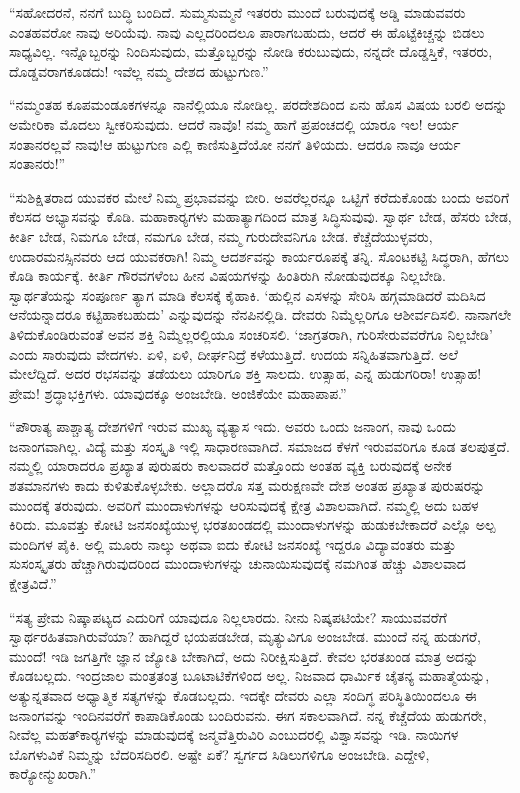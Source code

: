  “ಸಹೋದರನೆ, ನನಗೆ ಬುದ್ಧಿ ಬಂದಿದೆ. ಸುಮ್ಮಸುಮ್ಮನೆ ಇತರರು ಮುಂದೆ ಬರುವುದಕ್ಕೆ ಅಡ್ಡಿ ಮಾಡುವವರು ಎಂತಹವರೋ ನಾವು ಅರಿಯೆವು. ನಾವು ಎಲ್ಲದರಿಂದಲೂ ಪಾರಾಗಬಹುದು, ಆದರೆ ಈ ಹೊಟ್ಟೆಕಿಚ್ಚನ್ನು ಬಿಡಲು ಸಾಧ್ಯವಿಲ್ಲ. ಇನ್ನೊಬ್ಬರನ್ನು ನಿಂದಿಸುವುದು, ಮತ್ತೊಬ್ಬರನ್ನು ನೋಡಿ ಕರುಬುವುದು, ನನ್ನದೇ ದೊಡ್ಡಸ್ತಿಕೆ, ಇತರರು, ದೊಡ್ಡವರಾಗಕೂಡದು! ಇವೆಲ್ಲ ನಮ್ಮ ದೇಶದ ಹುಟ್ಟುಗುಣ.” 

 “ನಮ್ಮಂತಹ ಕೂಪಮಂಡೂಕಗಳನ್ನೂ ನಾನೆಲ್ಲಿಯೂ ನೋಡಿಲ್ಲ. ಪರದೇಶದಿಂದ ಏನು ಹೊಸ ವಿಷಯ ಬರಲಿ ಅದನ್ನು ಅಮೇರಿಕಾ ಮೊದಲು ಸ್ವೀಕರಿಸುವುದು. ಆದರೆ ನಾವೊ! ನಮ್ಮ ಹಾಗೆ ಪ್ರಪಂಚದಲ್ಲಿ ಯಾರೂ ಇಲ! ಆರ್ಯ ಸಂತಾನರಲ್ಲವೆ ನಾವು!‌ಆ ಹುಟ್ಟುಗುಣ ಎಲ್ಲಿ ಕಾಣಿಸುತ್ತಿದೆಯೋ ನನಗೆ ತಿಳಿಯದು. ಆದರೂ ನಾವೂ ಆರ್ಯ ಸಂತಾನರು!” 

 “ಸುಶಿಕ್ಷಿತರಾದ ಯುವಕರ ಮೇಲೆ ನಿಮ್ಮ ಪ್ರಭಾವವನ್ನು ಬೀರಿ. ಅವರೆಲ್ಲರನ್ನೂ ಒಟ್ಟಿಗೆ ಕರೆದುಕೊಂಡು ಬಂದು ಅವರಿಗೆ ಕೆಲಸದ ಅಭ್ಯಾಸವನ್ನು ಕೊಡಿ. ಮಹಾಕಾರ‍್ಯಗಳು ಮಹಾತ್ಯಾಗದಿಂದ ಮಾತ್ರ ಸಿದ್ಧಿಸುವುವು. ಸ್ವಾರ್ಥ ಬೇಡ, ಹೆಸರು ಬೇಡ, ಕೀರ್ತಿ ಬೇಡ, ನಿಮಗೂ ಬೇಡ, ನಮಗೂ ಬೇಡ, ನಮ್ಮ ಗುರುದೇವನಿಗೂ ಬೇಡ. ಕೆಚ್ಚೆದೆಯುಳ್ಳವರು, ಉದಾರಮನಸ್ಸಿನವರು ಆದ ಯುವಕರಾಗಿ! ನಿಮ್ಮ ಆದರ್ಶವನ್ನು ಕಾರ್ಯರೂಪಕ್ಕೆ ತನ್ನಿ. ಸೊಂಟಕಟ್ಟಿ ಸಿದ್ಧರಾಗಿ, ಹೆಗಲು ಕೊಡಿ ಕಾರ್ಯಕ್ಕೆ. ಕೀರ್ತಿ ಗೌರವಗಳೆಂಬ ಹೀನ ವಿಷಯಗಳನ್ನು ಹಿಂತಿರುಗಿ ನೋಡುವುದಕ್ಕೂ ನಿಲ್ಲಬೇಡಿ. ಸ್ವಾರ್ಥತೆಯನ್ನು ಸಂಪೂರ್ಣ ತ್ಯಾಗ ಮಾಡಿ ಕೆಲಸಕ್ಕೆ ಕೈಹಾಕಿ. ‘ಹುಲ್ಲಿನ ಎಸಳನ್ನು ಸೇರಿಸಿ ಹಗ್ಗಮಾಡಿದರೆ ಮದಿಸಿದ ಆನೆಯನ್ನಾದರೂ ಕಟ್ಟಿಹಾಕಬಹುದು’ ಎನ್ನುವುದನ್ನು ನೆನಪಿನಲ್ಲಿಡಿ. ದೇವರು ನಿಮ್ಮೆಲ್ಲರಿಗೂ ಆಶೀರ್ವದಿಸಲಿ. ನಾನಾಗಲೇ ತಿಳಿದುಕೊಂಡಿರುವಂತೆ ಅವನ ಶಕ್ತಿ ನಿಮ್ಮೆಲ್ಲರಲ್ಲಿಯೂ ಸಂಚರಿಸಲಿ. ‘ಜಾಗ್ರತರಾಗಿ, ಗುರಿಸೇರುವವರೆಗೂ ನಿಲ್ಲಬೇಡಿ’ ಎಂದು ಸಾರುವುದು ವೇದಗಳು. ಏಳಿ, ಏಳಿ, ದೀರ್ಘನಿದ್ರೆ ಕಳೆಯುತ್ತಿದೆ. ಉದಯ ಸನ್ನಿಹಿತವಾಗುತ್ತಿದೆ. ಅಲೆ ಮೇಲೆದ್ದಿದೆ. ಅದರ ರಭಸವನ್ನು ತಡೆಯಲು ಯಾರಿಗೂ ಶಕ್ತಿ ಸಾಲದು. ಉತ್ಸಾಹ, ಎನ್ನ ಹುಡುಗರಿರಾ! ಉತ್ಸಾಹ! ಪ್ರೇಮ! ಶ್ರದ್ಧಾಭಕ್ತಿಗಳು. ಯಾವುದಕ್ಕೂ ಅಂಜಬೇಡಿ. ಅಂಜಿಕೆಯೇ ಮಹಾಪಾಪ.” 

 “ಪೌರಾತ್ಯ ಪಾಶ್ಚಾತ್ಯ ದೇಶಗಳಿಗೆ ಇರುವ ಮುಖ್ಯ ವ್ಯತ್ಯಾಸ ಇದು. ಅವರು ಒಂದು ಜನಾಂಗ, ನಾವು ಒಂದು ಜನಾಂಗವಾಗಿಲ್ಲ. ವಿದ್ಯೆ ಮತ್ತು ಸಂಸ್ಕೃತಿ ಇಲ್ಲಿ ಸಾಧಾರಣವಾಗಿದೆ. ಸಮಾಜದ ಕೆಳಗೆ ಇರುವವರಿಗೂ ಕೂಡ ತಲಪುತ್ತದೆ. ನಮ್ಮಲ್ಲಿ ಯಾರಾದರೂ ಪ್ರಖ್ಯಾತ ಪುರುಷರು ಕಾಲವಾದರೆ ಮತ್ತೊಂದು ಅಂತಹ ವ್ಯಕ್ತಿ ಬರುವುದಕ್ಕೆ ಅನೇಕ ಶತಮಾನಗಳು ಕಾದು ಕುಳಿತುಕೊಳ್ಳಬೇಕು. ಅಲ್ಲಾದರೊ ಸತ್ತ ಮರುಕ್ಷಣವೇ ದೇಶ ಅಂತಹ ಪ್ರಖ್ಯಾತ ಪುರುಷರನ್ನು ಮುಂದಕ್ಕೆ ತರುವುದು. ಅವರಿಗೆ ಮುಂದಾಳುಗಳನ್ನು ಆರಿಸುವುದಕ್ಕೆ ಕ್ಷೇತ್ರ ವಿಶಾಲವಾಗಿದೆ. ನಮ್ಮಲ್ಲಿ ಅದು ಬಹಳ ಕಿರಿದು. ಮೂವತ್ತು ಕೋಟಿ ಜನಸಂಖ್ಯೆಯುಳ್ಳ ಭರತಖಂಡದಲ್ಲಿ ಮುಂದಾಳುಗಳನ್ನು ಹುಡುಕಬೇಕಾದರೆ ಎಲ್ಲೊ ಅಲ್ಪ ಮಂದಿಗಳ ಪೈಕಿ. ಅಲ್ಲಿ ಮೂರು ನಾಲ್ಕು ಅಥವಾ ಐದು ಕೋಟಿ ಜನಸಂಖ್ಯೆ ಇದ್ದರೂ ವಿದ್ಯಾವಂತರು ಮತ್ತು ಸುಸಂಸ್ಕೃತರು ಹೆಚ್ಚಾಗಿರುವುದರಿಂದ ಮುಂದಾಳುಗಳನ್ನು ಚುನಾಯಿಸುವುದಕ್ಕೆ ನಮಗಿಂತ ಹೆಚ್ಚು ವಿಶಾಲವಾದ ಕ್ಷೇತ್ರವಿದೆ.” 

 “ಸತ್ಯ ಪ್ರೇಮ ನಿಷ್ಕಾಪಟ್ಯದ ಎದುರಿಗೆ ಯಾವುದೂ ನಿಲ್ಲಲಾರದು. ನೀನು ನಿಷ್ಕಪಟಿಯೇ? ಸಾಯುವವರೆಗೆ ಸ್ವಾರ್ಥರಹಿತವಾಗಿರುವೆಯಾ? ಹಾಗಿದ್ದರೆ ಭಯಪಡಬೇಡ, ಮೃತ್ಯುವಿಗೂ ಅಂಜಬೇಡ. ಮುಂದೆ ನನ್ನ ಹುಡುಗರೆ, ಮುಂದೆ! ಇಡಿ ಜಗತ್ತಿಗೇ ಜ್ಞಾನ ಜ್ಯೋತಿ ಬೇಕಾಗಿದೆ, ಅದು ನಿರೀಕ್ಷಿಸುತ್ತಿದೆ. ಕೇವಲ ಭರತಖಂಡ ಮಾತ್ರ ಅದನ್ನು ಕೊಡಬಲ್ಲದು. ಇಂದ್ರಜಾಲ ಮಂತ್ರತಂತ್ರ ಬೂಟಾಟಿಕೆಗಳಿಂದ ಅಲ್ಲ. ನಿಜವಾದ ಧಾರ್ಮಿಕ ಚೈತನ್ಯ ಮಹಾತ್ಮೆಯನ್ನು, ಅತ್ಯುನ್ನತವಾದ ಅಧ್ಯಾತ್ಮಿಕ ಸತ್ಯಗಳನ್ನು ಕೊಡಬಲ್ಲದು. ಇದಕ್ಕೇ ದೇವರು ಎಲ್ಲಾ ಸಂದಿಗ್ಧ ಪರಿಸ್ಥಿತಿಯಿಂದಲೂ ಈ ಜನಾಂಗವನ್ನು ಇಂದಿನವರೆಗೆ ಕಾಪಾಡಿಕೊಂಡು ಬಂದಿರುವನು. ಈಗ ಸಕಾಲವಾಗಿದೆ. ನನ್ನ ಕೆಚ್ಚೆದೆಯ ಹುಡುಗರೇ, ನೀವೆಲ್ಲ ಮಹತ್‍ಕಾರ‍್ಯಗಳನ್ನು ಮಾಡುವುದಕ್ಕೆ ಜನ್ಮವೆತ್ತಿರುವಿರಿ ಎಂಬುದರಲ್ಲಿ ವಿಶ್ವಾಸವನ್ನು ಇಡಿ. ನಾಯಿಗಳ ಬೊಗಳುವಿಕೆ ನಿಮ್ಮನ್ನು ಬೆದರಿಸದಿರಲಿ. ಅಷ್ಟೇ ಏಕೆ? ಸ್ವರ್ಗದ ಸಿಡಿಲುಗಳಿಗೂ ಅಂಜಬೇಡಿ. ಎದ್ದೇಳಿ, ಕಾರ‍್ಯೋನ್ಮುಖರಾಗಿ.” 


